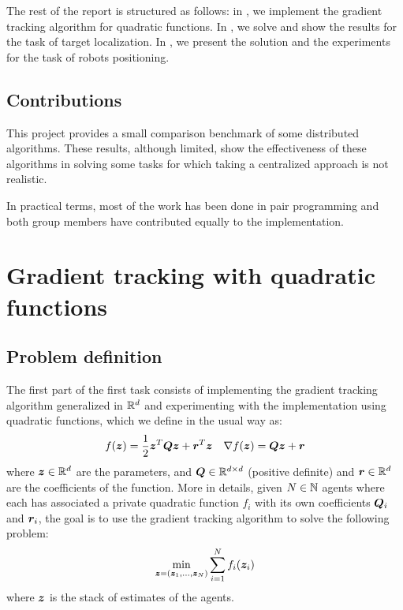 \documentclass[a4paper,11pt,oneside]{book}
\begin{document}
The rest of the report is structured as follows: in , we implement the gradient tracking algorithm for quadratic functions. In , we solve and show the results for the task of target localization. In , we present the solution and the experiments for the task of robots positioning.


\section*{Contributions}

This project provides a small comparison benchmark of some distributed algorithms. These results, although limited, show the effectiveness of these algorithms in solving some tasks for which taking a centralized approach is not realistic. 

In practical terms, most of the work has been done in pair programming and both group members have contributed equally to the implementation.





\setcounter{page}{1}
\chapter{Gradient tracking with quadratic functions} \label{ch:quadratic}


\section{Problem definition}



The first part of the first task consists of implementing the gradient tracking algorithm generalized in ${\mathbb{R}}^d$ and experimenting with the implementation using quadratic functions, which we define in the usual way as:
\[
      f({\bm{z}}) = \frac{1}{2} {\bm{z}}^T {\bm{Q}} {\bm{z}} + {\bm{r}}^T {\bm{z}}
      \quad
      \nabla f({\bm{z}}) = {\bm{Q}} {\bm{z}} + {\bm{r}}
\]
where ${\bm{z}} \in {\mathbb{R}}^{d}$ are the parameters, and ${\bm{Q}} \in {\mathbb{R}}^{d \times d}$ (positive definite) and ${\bm{r}} \in {\mathbb{R}}^{d}$ are the coefficients of the function. More in details, given $N \in {\mathbb{N}}$ agents where each has associated a private quadratic function $f_i$ with its own coefficients ${\bm{Q}}_i$ and ${\bm{r}}_i$, the goal is to use the gradient tracking algorithm to solve the following problem:
\[
      \min_{{\bm{z}}=({\bm{z}}_1, \dots, {\bm{z}}_N)} \sum_{i=1}^{N} f_i({\bm{z}}_i)
\]
where ${\bm{z}}$ is the stack of estimates of the agents.
\end{document}
